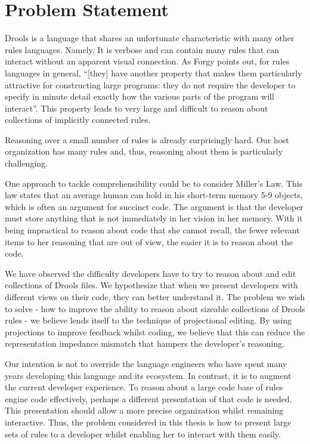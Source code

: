 \section{Problem Statement}

Drools is a language that shares an unfortunate characteristic with many other rules languages.
Namely, It is verbose and can contain many rules that can interact without an apparent visual connection.
As Forgy\cite{forgy1989rete} points out, for rules languages in general, ``[they] have another property that makes them particularly attractive for constructing large programs: they do not require the developer to specify in minute detail exactly how the various parts of the program will interact''.
This property leads to very large and difficult to reason about collections of implicitly connected rules.

Reasoning over a small number of rules is already surprisingly hard.
Our host organization has many rules and, thus, reasoning about them is particularly challenging.

One approach to tackle comprehensibility could be to consider Miller's Law\cite{miller1956magical}.
This law states that an average human can hold in his short-term memory 5-9 objects, which is often an argument for succinct code.
The argument is that the developer must store anything that is not immediately in her vision in her memory.
With it being impractical to reason about code that she cannot recall, the fewer relevant items to her reasoning that are out of view, the easier it is to reason about the code.

We have observed the difficulty developers have to try to reason about and edit collections of Drools files.
We hypothesize that when we present developers with different views on their code, they can better understand it.
The problem we wish to solve - how to improve the ability to reason about sizeable collections of Drools rules - we believe lends itself to the technique of projectional editing.
By using projections to improve feedback whilst coding, we believe that this can reduce the representation impedance mismatch that hampers the developer's reasoning.

Our intention is not to override the language engineers who have spent many years developing this language and its ecosystem.
In contrast, it is to augment the current developer experience.
To reason about a large code base of rules engine code effectively, perhaps a different presentation of that code is needed.
This presentation should allow a more precise organization whilst remaining interactive.
Thus, the problem considered in this thesis is how to present large sets of rules to a developer whilst enabling her to interact with them easily. 

